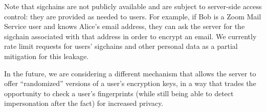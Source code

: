 Note that sigchains are not publicly available and are subject to server-side access control: they
are provided as needed to users. For example, if Bob is a Zoom Mail Service user and knows Alice's
email address, they can ask the server for the sigchain associated with that address in order to
encrypt an email. We currently rate limit requests for users' sigchains and other personal data as a
partial mitigation for this leakage.

In the future, we are considering a different mechanism that allows the server to offer
``randomized'' versions of a user's encryption keys, in a way that trades the opportunity to check a
user's fingerprints (while still being able to detect impersonation after the fact) for increased
privacy.
